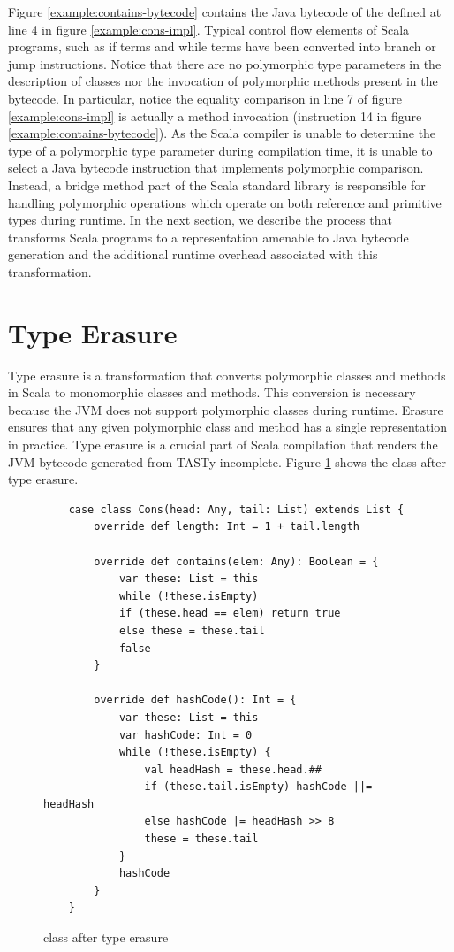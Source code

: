 Figure \ref{example:contains-bytecode} contains the Java bytecode of the  defined at line 4 in figure \ref{example:cons-impl}.
Typical control flow elements of Scala programs, such as if terms and while terms have been converted into branch or jump instructions.
Notice that there are no polymorphic type parameters in the description of classes nor the invocation of polymorphic methods present in the bytecode.
In particular, notice the equality comparison in line 7 of figure \ref{example:cons-impl} is actually a method invocation (instruction 14 in figure \ref{example:contains-bytecode}).
As the Scala compiler is unable to determine the type of a polymorphic type parameter during compilation time, it is unable to select a Java bytecode instruction that implements polymorphic comparison.
Instead, a bridge method part of the Scala standard library is responsible for handling polymorphic operations which operate on both reference and primitive types during runtime.
In the next section, we describe the process that transforms Scala programs to a representation amenable to Java bytecode generation and the additional runtime overhead associated with this transformation.

\section{Type Erasure}
\label{background:type-erasure}

Type erasure\cite{java:generics} is a transformation that converts polymorphic classes and methods in Scala to monomorphic classes and methods. 
This conversion is necessary because the JVM does not support polymorphic classes during runtime.
Erasure ensures that any given polymorphic class and method has a single representation in practice.
Type erasure is a crucial part of Scala compilation that renders the JVM bytecode generated from TASTy incomplete.
Figure \ref{example:erase-cons} shows the  class after type erasure.

\begin{figure}[!htb]
	\begin{verbatim}
	case class Cons(head: Any, tail: List) extends List {
		override def length: Int = 1 + tail.length
			
		override def contains(elem: Any): Boolean = {
			var these: List = this
			while (!these.isEmpty) 
			if (these.head == elem) return true
			else these = these.tail
			false
		}
			
		override def hashCode(): Int = {
			var these: List = this
			var hashCode: Int = 0
			while (!these.isEmpty) {
				val headHash = these.head.##
				if (these.tail.isEmpty) hashCode ||= headHash
				else hashCode |= headHash >> 8
				these = these.tail	
			}
			hashCode
		}
	}		
	\end{verbatim}
	\caption{ class after type erasure}
	\label{example:erase-cons}
\end{figure}

